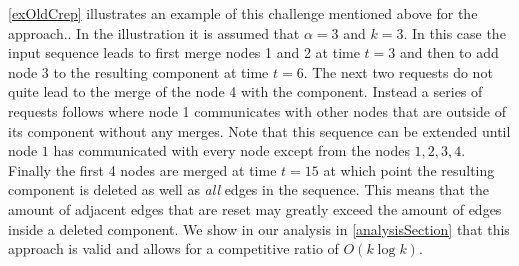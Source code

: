 \documentclass[a4paper,xcolor=dvipsnames, tikz, 12pt]{article}
\newcommand{\crep}{\text{C{\scriptsize REP}}}
\newcommand{\adjDel}{\text{A{\scriptsize DJ}-D{\scriptsize EL}}}
\theoremstyle{definition}
\begin{document}
	
	
	
	\cref{exOldCrep} illustrates an example of this challenge mentioned above for the \adjDel{} approach.. In the illustration it is assumed that $\alpha=3$ and $k=3$. In this case the input sequence leads \adjDel{} to first merge nodes 1 and 2 at time $t=3$ and then to add node 3 to the resulting component at time $t= 6$. The next two requests do not quite lead to the merge of the node 4 with the component. Instead a series of requests follows where node 1 communicates with other nodes that are outside of its component without any merges. Note that this sequence can be extended until node $1$ has communicated with every node except from the nodes $1,2,3,4$. Finally the first 4 nodes are merged at time $t=15$ at which point the resulting component is deleted as well as \textit{all} edges in the sequence.
	This means that the amount of adjacent edges that are reset may greatly exceed the amount of edges inside a deleted component.
	We show in our analysis in \cref{analysisSection} that this approach is valid and allows for a competitive ratio of $O(k\log k)$.
		
	
	
	
	
	
	
\end{document}
